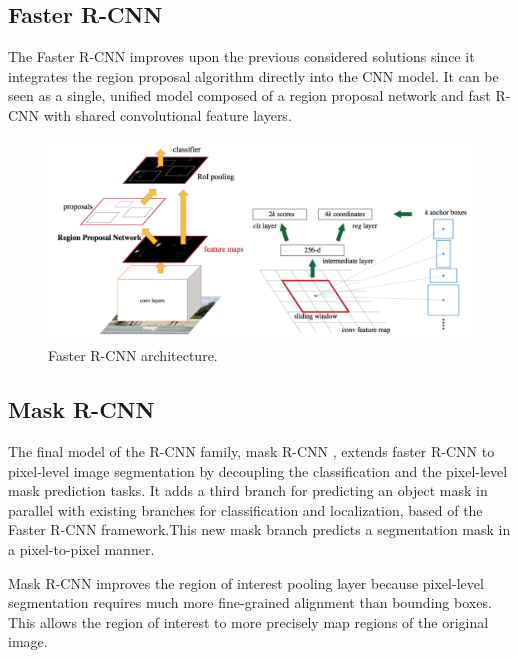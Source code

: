     
    \subsection{Faster R-CNN}
    \label{sec:fasterrcnn}

    \par The Faster R-CNN \cite{ren2015faster} improves upon the previous considered solutions since it integrates the region proposal algorithm directly into the CNN model. It can be seen as a single, unified model composed of a region proposal network and fast R-CNN with shared convolutional feature layers. \cite{weng2017detection3}

    \begin{figure}[htb]
        \centering
        \includegraphics[scale = 0.22]{Sections/2StateOfTheArt/2_images/faster-RCNN.png}
        \caption{Faster R-CNN architecture. \cite{weng2017detection3}} 
    \end{figure}
    

    \subsection{Mask R-CNN}

    \par The final model of the R-CNN family, mask R-CNN \cite{he2017mask}, extends faster R-CNN to pixel-level image segmentation by decoupling the classification and the pixel-level mask prediction tasks. It adds a third branch for predicting an object mask in parallel with existing branches for classification and localization, based of the Faster R-CNN framework.This new mask branch predicts a segmentation mask in a pixel-to-pixel manner.
    \par Mask R-CNN improves the region of interest pooling layer because pixel-level segmentation requires much more fine-grained alignment than bounding boxes. This allows the region of interest to more precisely map regions of the original image. \cite{weng2017detection3}

